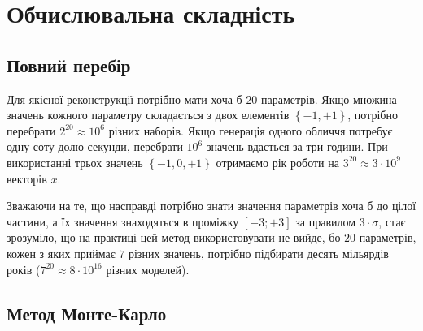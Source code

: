 \section{Обчислювальна складність}

\subsection{Повний перебір}

Для якісної реконструкції потрібно мати хоча б $20$ параметрів.
Якщо множина значень кожного параметру складається з двох елементів
$\left\{ -1, +1 \right\}$,
потрібно перебрати $2^{20} \approx 10^6$ різних наборів.
Якщо генерація одного обличчя потребує одну соту долю секунди,
перебрати $10^6$ значень вдасться за три години.
При використанні трьох значень $\left\{ -1, 0, +1 \right\}$
отримаємо рік роботи на $3^{20} \approx 3 \cdot 10^9$ векторів $x$.

Зважаючи на те,
що насправді потрібно знати значення параметрів хоча б до цілої частини,
а їх значення знаходяться в проміжку $\left[ -3; +3 \right]$ за правилом $3 \cdot \sigma$,
стає зрозуміло, що на практиці цей метод використовувати не вийде,
бо $20$ параметрів, кожен з яких приймає $7$ різних значень,
потрібно підбирати десять мільярдів років
($7^{20} \approx 8 \cdot 10^{16}$ різних моделей).

\subsection{Метод Монте-Карло}

